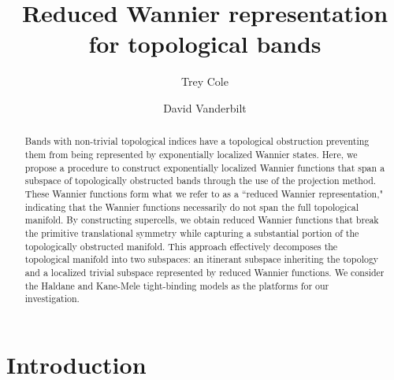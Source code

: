 \documentclass[galley,aps,pra,10pt,amsmath,amssymb,
    superscriptaddress,nofootinbib,longbibliography]{revtex4-2}
\begin{document}
\title{Reduced Wannier representation for topological bands}

\author{Trey Cole}

\author{David Vanderbilt}

\begin{abstract}

Bands with non-trivial topological indices have a topological obstruction preventing them from being represented by exponentially localized Wannier states. Here, we propose a procedure to construct exponentially localized Wannier functions that span a subspace of topologically obstructed bands through the use of the projection method. These Wannier functions form what we refer to as a ``reduced Wannier representation," indicating that the Wannier functions necessarily do not span the full topological manifold. By constructing supercells, we obtain reduced Wannier functions that break the primitive translational symmetry while capturing a substantial portion of the topologically obstructed manifold. This approach effectively decomposes the topological manifold into two subspaces: an itinerant subspace inheriting the topology and a localized trivial subspace represented by reduced Wannier functions. We consider the Haldane and Kane-Mele tight-binding models as the platforms for our investigation.


\end{abstract}

\maketitle

\section{Introduction}
\end{document}

